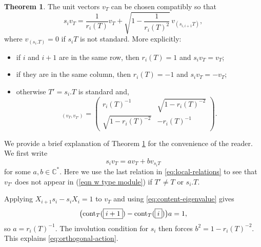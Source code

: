 \documentclass[11pt]{amsart}
\numberwithin{equation}{section}
\theoremstyle{definition}
\newtheorem{theorem}[thm]{Theorem}
\begin{document}
\begin{theorem}\cite[Proposition 4.1]{vershik2005new}\label{thm: Young's orthogonal form}
The unit vectors $v_{T}$ can be chosen compatibly so that
\begin{equation}
  s_{i}v_{T}=\frac{1}{r_i(T)}v_T
  +\sqrt{1-\frac{1}{r_i(T)^2}}\,v_{(s_{i,i+1}T)},
  \label{eq:orthogonal-action}
\end{equation}
where $v_{(s_{i}.T)}=0$ if $s_{i}T$ is not standard.  More explicitly:
\begin{itemize}
  \item if $i$ and $i+1$ are in the same row, then
        $r_{i}(T)=1$ and $s_{i}v_{T}=v_{T}$;
  \item if they are in the same column, then
        $r_{i}(T)=-1$ and $s_{i}v_{T}=-v_{T}$;
  \item otherwise $T'=s_{i}.T$ is standard and, 
        \begin{equation}
          [s_{i}]_{(v_{T},v_{T'})}=
          \begin{pmatrix}
            r_{i}(T)^{-1}&\sqrt{1-r_{i}(T)^{-2}}\\
            \sqrt{1-r_{i}(T)^{-2}}&-r_{i}(T)^{-1}
          \end{pmatrix}.
          \label{eq:orthogonal-block}
        \end{equation}
\end{itemize}
\end{theorem}

\noindent

We provide a brief explanation of Theorem \ref{thm: Young's orthogonal form} for the convenience of the reader. We first write
\begin{equation} \label{eqn w type module}
s_{i}v_{T}=av_{T}+bv_{s_{i}T} 
\end{equation}
for some \(a, b \in \mathbb C^*\). Here we use the last relation in 
\eqref{eq:local-relations} to see that \(v_{T'}\) does not appear in (\ref{eqn w type module}) if \(T'\neq T\) or \(s_i.T\). 


Applying $X_{i+1}s_{i}-s_{i}X_{i}=1$ to $v_{T}$ and using
\eqref{eq:content-eigenvalue} gives
\begin{equation*}
    \bigl(\textnormal{cont}_{T}(\boxed{i+1})-\textnormal{cont}_{T}(\boxed{i})\bigr)a=1,
\end{equation*}
so $a=r_{i}(T)^{-1}$. The involution condition for $s_{i}$ then forces
$b^2=1-r_{i}(T)^{-2}$.  This explains \eqref{eq:orthogonal-action}.  
\end{document}
